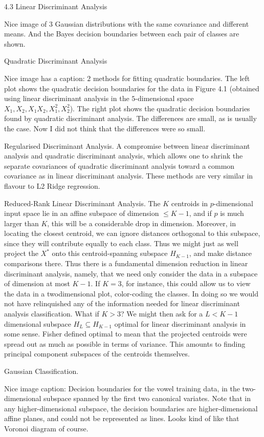 4.3 Linear Discriminant Analysis

Nice image of $3$ Gaussian distributions with the same covariance and different means. And the Bayes decision boundaries between each pair of classes are shown.

Quadratic Discriminant Analysis

Nice image has a caption: $2$ methods for fitting quadratic boundaries. The left plot shows the quadratic decision boundaries for the data in Figure 4.1 (obtained using linear discriminant analysis in the $5$-dimensional space $X_1, X_2, X_1 X_2, X_1^2, X_2^2$). The right plot shows the quadratic decision boundaries found by quadratic discriminant analysis. The differences are small, as is usually the case. Now I did not think that the differences were so small.

Regularised Discriminant Analysis. A compromise between linear discriminant analysis and quadratic discriminant analysis, which allows one to shrink the separate covariances of quadratic discriminant analysis toward a common covariance as in linear discriminant analysis. These methods are very similar in flavour to L2 Ridge regression.

Reduced-Rank Linear Discriminant Analysis. The $K$ centroids in $p$-dimensional input space lie in an affine subspace of dimension $\le K-1$, and if $p$ is much larger than $K$, this will be a considerable drop in dimension. Moreover, in locating the closest centroid, we can ignore distances orthogonal to this subspace, since they will contribute equally to each class. Thus we might just as well project the $X^*$ onto this centroid-spanning subspace $H_{K-1}$, and make distance comparisons there. Thus there is a fundamental dimension reduction in linear discriminant analysis, namely, that we need only consider the data in a subspace of dimension at most $K-1$. If $K=3$, for instance, this could allow us to view the data in a twodimensional plot, color-coding the classes. In doing so we would not have relinquished any of the information needed for linear discriminant analysis classification. What if $K>3$? We might then ask for a $L<K-1$ dimensional subspace $H_L \subseteq H_{K-1}$ optimal for linear discriminant analysis in some sense. Fisher defined optimal to mean that the projected centroids were spread out as much as possible in terms of variance. This amounts to finding principal component subspaces of the centroids themselves.

Gaussian Classification.

Nice image caption: Decision boundaries for the vowel training data, in the two-dimensional subspace spanned by the first two canonical variates. Note that in any higher-dimensional subspace, the decision boundaries are higher-dimensional affine planes, and could not be represented as lines. Looks kind of like that Voronoi diagram of course.

